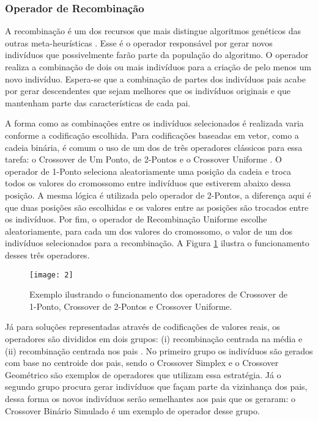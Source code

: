 \subsubsection{Operador de Recombinação}
A recombinação é um dos recursos que mais distingue algoritmos genéticos das outras meta-heurísticas \cite{Luke2013Metaheuristics}. Esse é o operador responsável por gerar novos indivíduos que possivelmente farão parte da população do algoritmo. O operador realiza a combinação de dois ou mais indivíduos para a criação de pelo menos um novo indivíduo. Espera-se que a combinação de partes dos indivíduos pais acabe por gerar descendentes que sejam melhores que os indivíduos originais \cite{Kacprzyk2015} e que mantenham parte das características de cada pai.

A forma como as combinações entre os indivíduos selecionados é realizada varia conforme a codificação escolhida. Para codificações baseadas em vetor, como a cadeia binária, é comum o uso de um dos de três operadores clássicos para essa tarefa: o Crossover de Um Ponto, de 2-Pontos e o Crossover Uniforme \cite{Talbi2009}. O operador de 1-Ponto seleciona aleatoriamente uma posição da cadeia e troca todos os valores do cromossomo entre indivíduos que estiverem abaixo dessa posição.  A mesma lógica é utilizada pelo operador de 2-Pontos, a diferença aqui é que duas posições são escolhidas e os valores entre as posições são trocados entre os indivíduos. Por fim, o operador de Recombinação Uniforme escolhe aleatoriamente, para cada um dos valores do cromossomo, o valor de um dos indivíduos selecionados para a recombinação. A Figura \ref{fig:fig2_2} ilustra o funcionamento desses três operadores.

\begin{figure}[htb]
\centering
\texttt{[image: 2]}
\caption{Exemplo ilustrando o funcionamento dos operadores de Crossover de 1-Ponto, Crossover de 2-Pontos e Crossover Uniforme.}
\label{fig:fig2_2}
\end{figure}

Já para soluções representadas através de codificações de valores reais, os operadores são divididos em dois grupos: (i) recombinação centrada na média e (ii) recombinação centrada nos pais \cite{Talbi2009}. No primeiro grupo os indivíduos são gerados com base no centroide dos pais, sendo o Crossover Simplex \cite{Tsutsui1999} e o Crossover Geométrico \cite{Michalewicz1996} são exemplos de operadores que utilizam essa estratégia. Já o segundo grupo procura gerar indivíduos que façam parte da vizinhança dos pais, dessa forma os novos indivíduos serão semelhantes aos pais que os geraram: o Crossover Binário Simulado \cite{Deb1994} é um exemplo de operador desse grupo.   

